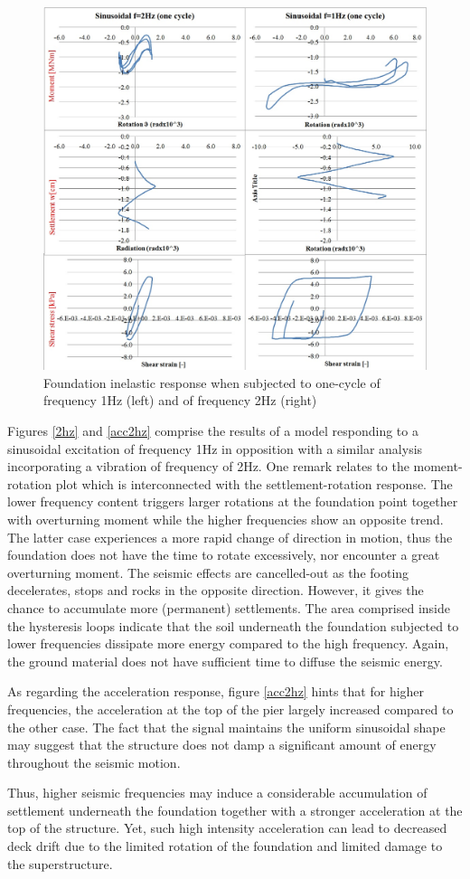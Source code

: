  
 \begin{figure}[!h]
 	\centering
 	\includegraphics[width=0.6\linewidth]{"sinusoidal2"}
 	\caption{Foundation inelastic response when subjected to one-cycle of frequency 1Hz (left) and of frequency 2Hz (right)}
 	\label{sinus}
 \end{figure}
 Figures \ref{2hz} and \ref{acc2hz} comprise the results of a model responding to a sinusoidal excitation of frequency 1Hz in opposition with a similar analysis incorporating a vibration of frequency of 2Hz. One remark relates to the moment-rotation plot which is interconnected with the settlement-rotation response. The lower frequency content triggers larger rotations at the foundation point together with overturning moment while the higher frequencies show an opposite trend. The latter case experiences a more rapid change of direction in motion, thus the foundation does not have the time to rotate excessively, nor encounter a great overturning moment. The seismic effects are cancelled-out as the footing decelerates, stops and rocks in the opposite direction. However, it gives the chance to accumulate more (permanent) settlements. The area comprised inside the hysteresis loops indicate that the soil underneath the foundation subjected to lower frequencies dissipate more energy compared to the high frequency. Again, the ground material does not have sufficient time to diffuse the seismic energy.
 
 As regarding the acceleration response, figure \ref{acc2hz} hints that for higher frequencies, the acceleration at the top of the pier largely increased compared to the other case. The fact that the signal maintains the uniform sinusoidal shape may suggest that the structure does not damp a significant amount of energy throughout the seismic motion.
 
 Thus, higher seismic frequencies may induce a considerable accumulation of settlement \mbox{underneath} the foundation together with a stronger acceleration at the top of the structure. Yet, such high intensity acceleration can lead to decreased deck drift due to the limited rotation of the foundation and limited damage to the superstructure.
 
